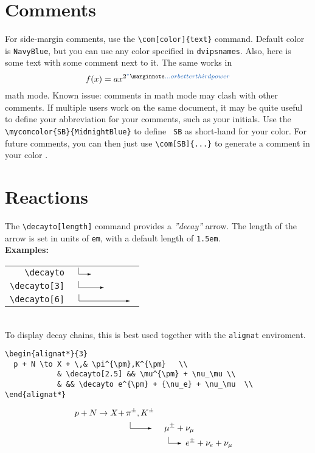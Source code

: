 \documentclass[a4paper,11pt]{article}
\begin{document}
\section{Comments}
For side-margin comments, use the \verb|\com[color]{text}| command. Default
color is {\tt NavyBlue}, but you can use any color specified in {\tt dvipsnames}.
Also, here is some text with some comment 
next to it. The same works in 
\[
  f(x) = ax^{2\com{... or better third power}}
\]
math mode. Known issue: comments in math mode may clash with other comments.
If multiple users work on the same document, it may be quite useful to define
your abbreviation for your comments, such as your initials. Use the 
\verb|\mycomcolor{SB}{MidnightBlue}|  to define {\tt
SB} as short-hand for your color. For future comments, you can then just use
\verb|\com[SB]{...}| to generate a comment in your color .

\section{Reactions}
The \verb|\decayto[length]| command provides a {\it ''decay''} arrow. The length of
the arrow is set in units of {\tt em}, with a default length of {\tt 1.5em}.\\

{\bf Examples:}\\
\begin{tabular}{rl}
  \verb|\decayto| & $\decayto$ \\
  \verb|\decayto[3]| & $\decayto[3]$ \\
  \verb|\decayto[6]| & $\decayto[6]$ \\
\end{tabular}\\[2\baselineskip]

To display decay chains, this is best used together with the \verb|alignat|
enviroment.
\begin{verbatim}
\begin{alignat*}{3}
  p + N \to X + \,& \pi^{\pm},K^{\pm}   \\
            & \decayto[2.5] && \mu^{\pm} + \nu_\mu \\
            & && \decayto e^{\pm} + {\nu_e} + \nu_\mu  \\
\end{alignat*}
\end{verbatim}
\begin{alignat*}{3}
  p + N \to X + \,& \pi^{\pm},K^{\pm}   \\
            & \decayto[2.5] && \mu^{\pm} + \nu_\mu \\
            & && \decayto e^{\pm} + {\nu_e} + \nu_\mu  \\
\end{alignat*}
\end{document}
